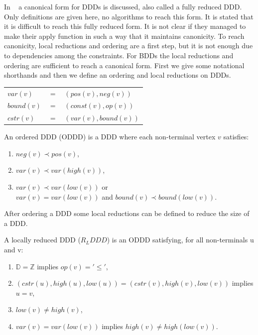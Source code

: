 \documentclass[11pt]{article}
\begin{document}
In ~\cite{ddds} a canonical form for DDDs is discussed, also called a fully reduced DDD. Only definitions are given here, no algorithms to reach this form. It is stated that it is difficult to reach this fully reduced form. It is not clear if they managed to make their apply function in such a way that it maintains canonicity. To reach canonicity, local reductions and ordering are a first step, but it is not enough due to dependencies among the constraints. For BDDs the local reductions and ordering are sufficient to reach a canonical form. First we give some notational shorthands and then we define an ordering and local reductions on DDDs.
%
\begin{center}
\begin{tabular}{lll}
$var(v)$   & $=$ & $(pos(v),neg(v))$   \\
$bound(v)$ & $=$ & $(const(v),op(v))$  \\
$cstr(v)$  & $=$ & $(var(v),bound(v))$
\end{tabular}
\end{center}

\begin{mydef}
\label{def:ODDD}
An ordered DDD (ODDD) is a DDD where each non-terminal vertex $v$ satisfies:
\begin{enumerate}
  \item $neg(v) \prec pos(v)$,
  \item $var(v) \prec var(high(v))$,
  \item $var(v) \prec var(low(v))$ or \\ $var(v) = var(low(v))$ and $bound(v) \prec bound(low(v))$.
\end{enumerate}
\end{mydef}

After ordering a DDD some local reductions can be defined to reduce the size of a DDD.

\begin{mydef}
A locally reduced DDD ($R_LDDD$) is an ODDD satisfying, for all non-terminals u and v:
\begin{enumerate}
  \item $\mathbb{D} = \mathbb{Z}$ implies $op(v) = '\leq'$,
  \item $(cstr(u),high(u),low(u)) = (cstr(v),high(v),low(v))$ implies $u = v$,
  \item $low(v) \neq high(v)$,
  \item $var(v) = var(low(v))$ implies $high(v) \neq high(low(v))$.
\end{enumerate}
\end{mydef}
\end{document}
